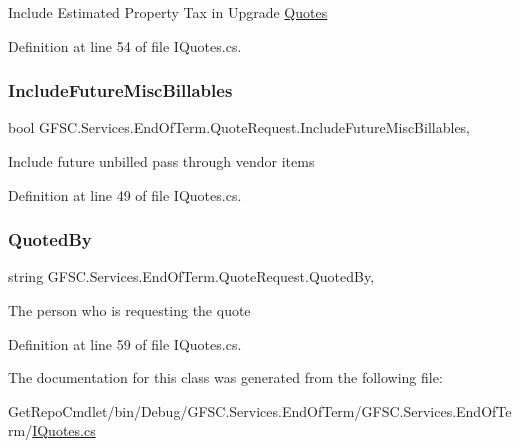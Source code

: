Include Estimated Property Tax in Upgrade \mbox{\hyperlink{class_g_f_s_c_1_1_services_1_1_end_of_term_1_1_quotes}{Quotes}} 



Definition at line 54 of file I\+Quotes.\+cs.

\mbox{\label{class_g_f_s_c_1_1_services_1_1_end_of_term_1_1_quote_request_a3a383f2e472c4edea42ff52c7815512f}} 
\subsubsection{\texorpdfstring{Include\+Future\+Misc\+Billables}{IncludeFutureMiscBillables}}
{\footnotesize\ttfamily bool G\+F\+S\+C.\+Services.\+End\+Of\+Term.\+Quote\+Request.\+Include\+Future\+Misc\+Billables\hspace{0.3cm}{\ttfamily [get]}, {\ttfamily [set]}}



Include future unbilled pass through vendor items 



Definition at line 49 of file I\+Quotes.\+cs.

\mbox{\label{class_g_f_s_c_1_1_services_1_1_end_of_term_1_1_quote_request_a15ba7c16dfd4f41928a2c318af891e9d}} 
\subsubsection{\texorpdfstring{Quoted\+By}{QuotedBy}}
{\footnotesize\ttfamily string G\+F\+S\+C.\+Services.\+End\+Of\+Term.\+Quote\+Request.\+Quoted\+By\hspace{0.3cm}{\ttfamily [get]}, {\ttfamily [set]}}



The person who is requesting the quote 



Definition at line 59 of file I\+Quotes.\+cs.



The documentation for this class was generated from the following file\+:\begin{DoxyCompactItemize}
\item 
Get\+Repo\+Cmdlet/bin/\+Debug/\+G\+F\+S\+C.\+Services.\+End\+Of\+Term/\+G\+F\+S\+C.\+Services.\+End\+Of\+Term/\mbox{\hyperlink{_i_quotes_8cs}{I\+Quotes.\+cs}}\end{DoxyCompactItemize}
